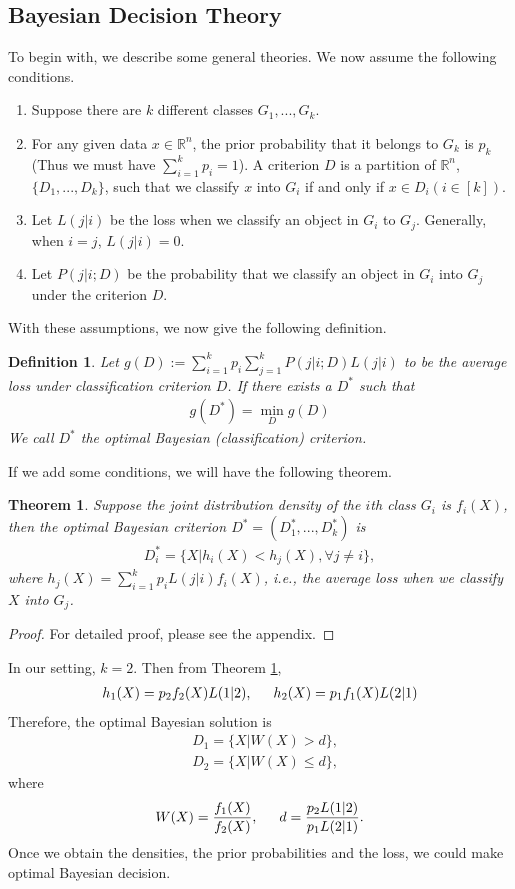 \documentclass[english]{article}
\newenvironment{eqt}{\begin{equation}\begin{aligned}}{\end{aligned}\end{equation}}
\newtheorem{defn}{Definition}[section]
\newtheorem{thm}{Theorem}[section]
\begin{document}
\subsection{Bayesian Decision Theory}
\par
To begin with, we describe some general theories. We now assume the following conditions.
\begin{enumerate}
\item Suppose there are $k$ different classes $G_1, ..., G_k$. 
\item For any given data $x\in \mathbb{R}^n$, the prior probability that it belongs to $G_k$ is $p_k$ (Thus we must have $\sum_{i=1}^kp_i=1$). A criterion $D$ is a partition of $\mathbb{R}^n$, $\{D_1, ..., D_k\}$, such that we classify $x$ into $G_i$ if and only if $x\in D_i (i\in[k])$.
\item Let $L(j|i)$ be the loss when we classify an object in $G_i$ to $G_j$. Generally, when $i=j$, $L(j|i) = 0$.
\item Let $P(j|i;D)$ be the probability that we classify an object in $G_i$ into $G_j$ under the criterion $D$.
\end{enumerate}
\par
With these assumptions, we now give the following definition.

\begin{defn}
Let $g(D) := \sum_{i=1}^kp_i\sum_{j=1}^kP(j|i;D)L(j|i)$ to be the average loss under classification criterion $D$. If there exists a $D^*$ such that
\begin{eqt}
g(D^*) = \min_Dg(D)
\end{eqt}
We call $D^*$ the optimal Bayesian (classification) criterion.
\end{defn}
If we add some conditions, we will have the following theorem.
\begin{thm}
\label{optbayes}
Suppose the joint distribution density of the $i$th class $G_i$ is $f_i(X)$, then the optimal Bayesian criterion $D^*=(D_1^*, ..., D_k^*)$ is
\begin{eqt}
\label{optbayescrit}
D_i^* = \{X|h_i(X)<h_j(X), \forall j\neq i\},
\end{eqt}
where $h_j(X) = \sum_{i=1}^kp_iL(j|i)f_i(X)$, i.e., the average loss when we classify $X$ into $G_j$.
\end{thm}
\begin{proof}
For detailed proof, please see the appendix.
\end{proof}
\par
In our setting, $k=2$. Then from Theorem \ref{optbayes},
\begin{eqt}
h_1(X) = p_2f_2(X)L(1|2),\indent h_2(X) = p_1f_1(X)L(2|1)
\end{eqt}
Therefore, the optimal Bayesian solution is 
\begin{eqt}
&D_1 = \{X|W(X)>d\}, \\
&D_2 = \{X|W(X)\leqslant d\},
\end{eqt}
where
\begin{eqt}
\label{param}
W(X) = \frac{f_1(X)}{f_2(X)},\indent d = \frac{p_2L(1|2)}{p_1L(2|1)}.
\end{eqt}
Once we obtain the densities, the prior probabilities and the loss, we could make optimal Bayesian decision.
\end{document}

